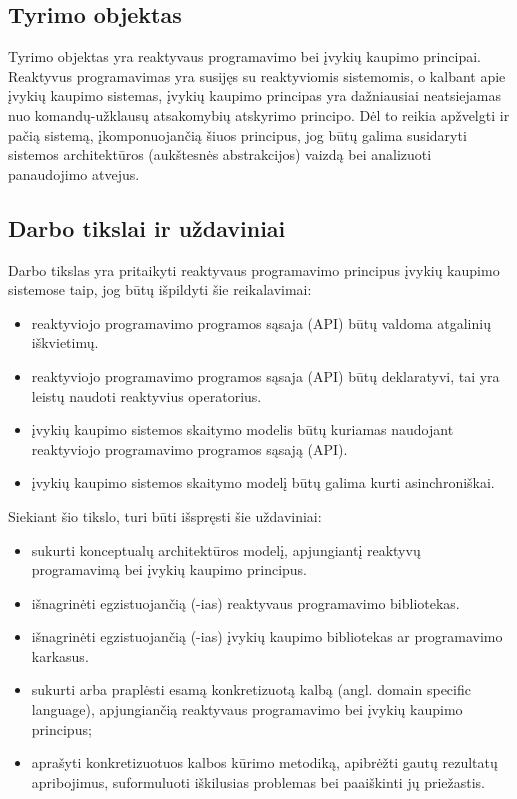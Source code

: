 \subsection{Tyrimo objektas}

    Tyrimo objektas yra reaktyvaus programavimo bei įvykių kaupimo principai. Reaktyvus programavimas yra susijęs su reaktyviomis sistemomis, o kalbant apie įvykių kaupimo sistemas, įvykių kaupimo principas yra dažniausiai neatsiejamas nuo komandų-užklausų atsakomybių atskyrimo principo. Dėl to reikia apžvelgti ir pačią sistemą, įkomponuojančią šiuos principus, jog būtų galima susidaryti sistemos architektūros (aukštesnės abstrakcijos) vaizdą bei analizuoti panaudojimo atvejus.

\subsection{Darbo tikslai ir uždaviniai}

    Darbo tikslas yra pritaikyti reaktyvaus programavimo principus įvykių kaupimo sistemose taip, jog būtų išpildyti šie reikalavimai:

\begin{itemize}

    \item reaktyviojo programavimo programos sąsaja (API) būtų valdoma atgalinių iškvietimų.

    \item reaktyviojo programavimo programos sąsaja (API) būtų deklaratyvi, tai yra leistų naudoti reaktyvius operatorius.

    \item įvykių kaupimo sistemos skaitymo modelis būtų kuriamas naudojant reaktyviojo programavimo programos sąsają (API).

    \item įvykių kaupimo sistemos skaitymo modelį būtų galima kurti asinchroniškai.

\end{itemize}

    Siekiant šio tikslo, turi būti išspręsti šie uždaviniai:

\begin{itemize}
        \item sukurti konceptualų architektūros modelį, apjungiantį reaktyvų programavimą bei įvykių kaupimo principus.
        \item išnagrinėti egzistuojančią (-ias) reaktyvaus programavimo bibliotekas.
        \item išnagrinėti egzistuojančią (-ias) įvykių kaupimo bibliotekas ar programavimo karkasus.
        \item sukurti arba praplėsti esamą konkretizuotą kalbą (angl. domain specific language), apjungiančią reaktyvaus programavimo bei įvykių kaupimo principus;
        \item aprašyti konkretizuotuos kalbos kūrimo metodiką, apibrėžti gautų rezultatų apribojimus, suformuluoti iškilusias problemas bei paaiškinti jų priežastis.
\end{itemize}

